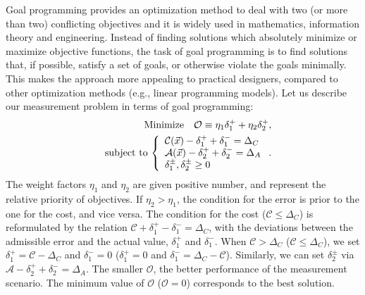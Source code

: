 \documentclass[aps,pra,twocolumn,showpacs,superscriptaddress,groupedaddress]{revtex4}  %
\begin{document}
Goal programming \cite{Goal} provides an optimization method to deal
with two (or more than two) conflicting objectives and it is widely used in
mathematics, information theory and engineering.
Instead of finding solutions which absolutely minimize or maximize
objective functions,
the task of goal programming is to find solutions that, if possible,
satisfy a set of goals, or otherwise violate the goals minimally.
This makes the approach more appealing to practical designers, compared
to other optimization methods (e.g., linear programming models).
Let us describe our measurement problem in terms of goal programming:
\begin{eqnarray}
&&
{\rm Minimize}\quad
\mathcal{O}\equiv \eta_{1}\delta_{1}^{+} + \eta_{2}\delta_{2}^{+},
 \nonumber \\
&&
{\rm subject\,\,to}\,
\left\{
\begin{array}{l}
\mathcal{C}(\vec{x})-\delta_{1}^{+}+\delta_{1}^{-} = \Delta_{C} \\
\mathcal{A}(\vec{x})-\delta_{2}^{+}+\delta_{2}^{-} = \Delta_{A} \\
\delta_{1}^{\pm},\delta_{2}^{\pm} \ge 0 
\end{array}
\right. .
\label{GP}
\end{eqnarray}
The weight factors $\eta_{1}$ and $\eta_{2}$ are given positive
number, and represent the relative priority of objectives.
If $\eta_{2} > \eta_{1}$, the condition for the
error is prior to the one for the cost, and vice versa.
The condition for the cost ($\mathcal{C}\le \Delta_{C}$) is reformulated by
the relation
\(
\mathcal{C} +\delta_{1}^{+}-\delta_{1}^{-} = \Delta_{C}
\), with the deviations between the admissible error and the actual
value, $\delta_{1}^{+}$ and $\delta_{1}^{-}$.
When $\mathcal{C} > \Delta_{C}$ ($\mathcal{C} \le \Delta_{C}$),
we set $\delta_{1}^{+}=\mathcal{C}-\Delta_{C}$ and $\delta_{1}^{-}=0$
($\delta_{1}^{+}=0$ and $\delta_{1}^{-}=\Delta_{C}-\mathcal{C}$).
Similarly, we can set $\delta_{2}^{\pm}$ via
$\mathcal{A}-\delta_{2}^{+}+\delta_{2}^{-}=\Delta_{A}$.
The smaller $\mathcal{O}$, the better performance of the measurement scenario.
The minimum value of $\mathcal{O}$ ($\mathcal{O}=0$) corresponds
to the best solution.
\end{document}
